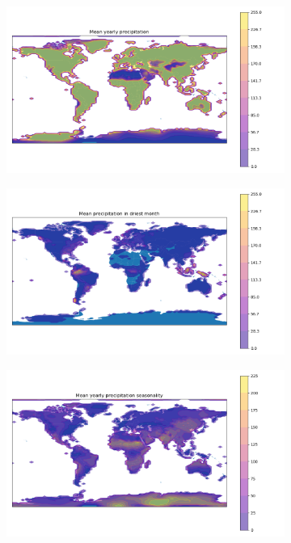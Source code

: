 \begin{figure}[H]
\begin{subfigure}{.3\linewidth}
\end{subfigure} 

\begin{subfigure}{.3\linewidth}
  \includegraphics[width=\linewidth]{Images/mean_precip.png}

\end{subfigure}
\begin{subfigure}{.3\linewidth}
  \includegraphics[width=\linewidth]{Images/mean_precip_dry.png}

\end{subfigure}
\begin{subfigure}{.3\linewidth}
  \includegraphics[width=\linewidth]{Images/mean_precip_seasonality.png} 


\end{subfigure}
\end{figure}
